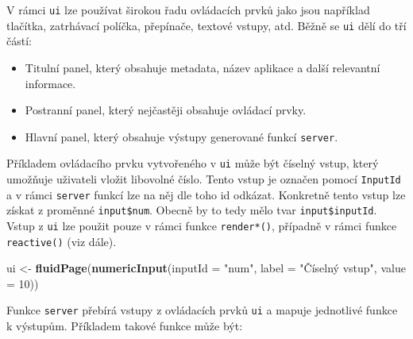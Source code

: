 \documentclass[12pt,]{article}
\newenvironment{Shaded}{\begin{snugshade}}{\end{snugshade}}
\newcommand{\KeywordTok}[1]{\textcolor[rgb]{0.13,0.29,0.53}{\textbf{#1}}}
\newcommand{\DataTypeTok}[1]{\textcolor[rgb]{0.13,0.29,0.53}{#1}}
\newcommand{\DecValTok}[1]{\textcolor[rgb]{0.00,0.00,0.81}{#1}}
\newcommand{\StringTok}[1]{\textcolor[rgb]{0.31,0.60,0.02}{#1}}
\newcommand{\OperatorTok}[1]{\textcolor[rgb]{0.81,0.36,0.00}{\textbf{#1}}}
\newcommand{\NormalTok}[1]{#1}
\providecommand{\tightlist}{%
  \setlength{\itemsep}{0pt}\setlength{\parskip}{0pt}}
\begin{document}
V rámci \texttt{ui} lze používat širokou řadu ovládacích prvků jako jsou
například tlačítka, zatrhávací políčka, přepínače, textové vstupy, atd.
Běžně se \texttt{ui} dělí do tří částí:

\begin{itemize}
\tightlist
\item
  Titulní panel, který obsahuje metadata, název aplikace a další
  relevantní informace.
\item
  Postranní panel, který nejčastěji obsahuje ovládací prvky.
\item
  Hlavní panel, který obsahuje výstupy generované funkcí
  \texttt{server}.
\end{itemize}

Příkladem ovládacího prvku vytvořeného v \texttt{ui} může být číselný
vstup, který umožňuje uživateli vložit libovolné číslo. Tento vstup je
označen pomocí \texttt{InputId} a v rámci \texttt{server} funkcí lze na
něj dle toho id odkázat. Konkretně tento vstup lze získat z proměnné
\texttt{input\$num}. Obecně by to tedy mělo tvar
\texttt{input\$inputId}. Vstup z \texttt{ui} lze použit pouze v rámci
funkce \texttt{render*()}, případně v rámci funkce \texttt{reactive()}
(viz dále).

\begin{Shaded}
\begin{Highlighting}[]
\NormalTok{ui <-}\StringTok{ }\KeywordTok{fluidPage}\NormalTok{(}\KeywordTok{numericInput}\NormalTok{(}\DataTypeTok{inputId =} \StringTok{"num"}\NormalTok{,}
                             \DataTypeTok{label =} \StringTok{"Číselný vstup"}\NormalTok{,}
                             \DataTypeTok{value =} \DecValTok{10}\NormalTok{))}
\end{Highlighting}
\end{Shaded}

Funkce \texttt{server} přebírá vstupy z ovládacích prvků \texttt{ui} a
mapuje jednotlivé funkce k výstupům. Příkladem takové funkce může být:

\begin{Shaded}
\end{Shaded}
\end{document}
